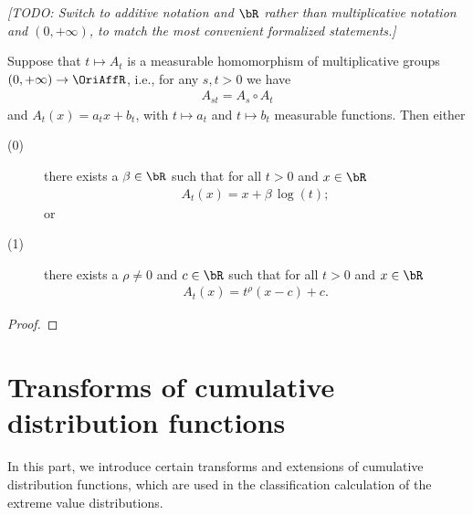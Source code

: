 \begin{theorem}
  \label{thm:one-parameter-subgroups-of-affine-isomorphisms}
  \leanok
  \emph{[TODO: Switch to additive notation and $\bR$ rather than multiplicative
  notation and $(0,+\infty)$, to match the most convenient formalized statements.]}

  Suppose that $t \mapsto A_t$ is a measurable homomorphism of multiplicative groups
  $(0,+\infty) \to \OriAffR$, i.e., for any $s, t > 0$ we have
  \begin{align*}
    A_{s t} = A_s \circ A_t
  \end{align*}
  and $A_t(x) = a_t x + b_t$, with $t \mapsto a_t$ and $t \mapsto b_t$
  measurable functions.
  Then either
  \begin{description}
    \item[(0)] there exists a $\beta \in \bR$ such that for all $t > 0$ and $x \in \bR$
      \begin{align*}
        A_t(x) = x + \beta \, \log(t) ;
      \end{align*}
      or
    \item[(1)] there exists a $\rho \ne 0$ and $c \in \bR$ such that
      for all $t > 0$ and $x \in \bR$
      \begin{align*}
        A_t(x) = t^{\rho} (x - c) + c .
      \end{align*}
  \end{description}
\end{theorem}
\begin{proof}
  \leanok
\end{proof}


\chapter{Transforms of cumulative distribution functions}

In this part, we introduce certain transforms and extensions of
cumulative distribution functions, which are used in the classification
calculation of the extreme value distributions.


